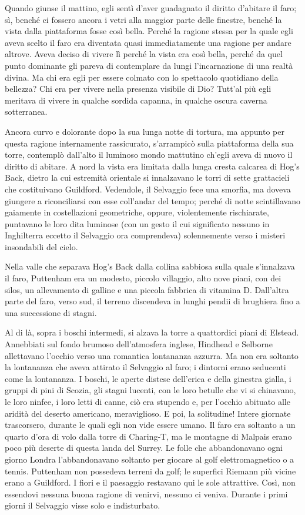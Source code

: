 \documentclass[
a5paper, %
10pt, %
twoside, 
onecolumn, %
openany, %
]{memoir}
\begin{document}
Quando giunse il mattino, egli sentì d’aver guadagnato il diritto d’abitare il faro; sì, benché ci fossero ancora i vetri alla maggior parte delle finestre, benché la vista dalla piattaforma fosse così bella. Perché la ragione stessa per la quale egli aveva scelto il faro era diventata quasi immediatamente una ragione per andare altrove. Aveva deciso di vivere lì perché la vista era così bella, perché da quel punto dominante gli pareva di contemplare da lungi l’incarnazione di una realtà divina. Ma chi era egli per essere colmato con lo spettacolo quotidiano della bellezza? Chi era per vivere nella presenza visibile di Dio? Tutt’al più egli meritava di vivere in qualche sordida capanna, in qualche oscura caverna sotterranea.

Ancora curvo e dolorante dopo la sua lunga notte di tortura, ma appunto per questa ragione internamente rassicurato, s’arrampicò sulla piattaforma della sua torre, contemplò dall’alto il luminoso mondo mattutino ch’egli aveva di nuovo il diritto di abitare. A nord la vista era limitata dalla lunga cresta calcarea di Hog’s Back, dietro la cui estremità orientale si innalzavano le torri di sette grattacieli che costituivano Guildford. Vedendole, il Selvaggio fece una smorfia, ma doveva giungere a riconciliarsi con esse coll’andar del tempo; perché di notte scintillavano gaiamente in costellazioni geometriche, oppure, violentemente rischiarate, puntavano le loro dita luminose (con un gesto il cui significato nessuno in Inghilterra eccetto il Selvaggio ora comprendeva) solennemente verso i misteri insondabili del cielo.

Nella valle che separava Hog’s Back dalla collina sabbiosa sulla quale s’innalzava il faro, Puttenham era un modesto, piccolo villaggio, alto nove piani, con dei silos, un allevamento di galline e una piccola fabbrica di vitamina D. Dall’altra parte del faro, verso sud, il terreno discendeva in lunghi pendii di brughiera fino a una successione di stagni.

Al di là, sopra i boschi intermedi, si alzava la torre a quattordici piani di Elstead. Annebbiati sul fondo brumoso dell’atmosfera inglese, Hindhead e Selborne allettavano l’occhio verso una romantica lontananza azzurra. Ma non era soltanto la lontananza che aveva attirato il Selvaggio al faro; i dintorni erano seducenti come la lontananza. I boschi, le aperte distese dell’erica e della ginestra gialla, i gruppi di pini di Scozia, gli stagni lucenti, con le loro betulle che vi si chinavano, le loro ninfee, i loro letti di canne, ciò era stupendo e, per l’occhio abituato alle aridità del deserto americano, meraviglioso. E poi, la solitudine! Intere giornate trascorsero, durante le quali egli non vide essere umano. Il faro era soltanto a un quarto d’ora di volo dalla torre di Charing-T, ma le montagne di Malpais erano poco più deserte di questa landa del Surrey. Le folle che abbandonavano ogni giorno Londra l’abbandonavano soltanto per giocare al golf elettromagnetico o a tennis. Puttenham non possedeva terreni da golf; le superfici Riemann più vicine erano a Guildford. I fiori e il paesaggio restavano qui le sole attrattive. Così, non essendovi nessuna buona ragione di venirvi, nessuno ci veniva. Durante i primi giorni il Selvaggio visse solo e indisturbato.
\end{document}

